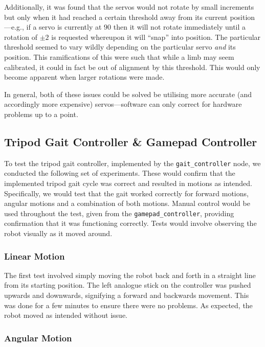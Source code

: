 Additionally, it was found that the servos would not rotate by small increments but only when it had reached a certain threshold away from its current position---e.g., if a servo is currently at $90$\textdegree{} then it will not rotate immediately until a rotation of $\pm2$\textdegree{} is requested whereupon it will ``snap'' into position. The particular threshold seemed to vary wildly depending on the particular servo \emph{and} its position. This ramifications of this were such that while a limb may seem calibrated, it could in fact be out of alignment by this threshold. This would only become apparent when larger rotations were made.

In general, both of these issues could be solved be utilising more accurate (and accordingly more expensive) servos---software can only correct for hardware problems up to a point.

\subsection{Tripod Gait Controller \& Gamepad Controller}

To test the tripod gait controller, implemented by the \texttt{gait\_controller} node, we conducted the following set of experiments. These would confirm that the implemented tripod gait cycle was correct and resulted in motions as intended. Specifically, we would test that the gait worked correctly for forward motions, angular motions and a combination of both motions. Manual control would be used throughout the test, given from the \texttt{gamepad\_controller}, providing confirmation that it was functioning correctly. Tests would involve observing the robot visually as it moved around.

\subsubsection{Linear Motion}

The first test involved simply moving the robot back and forth in a straight line from its starting position. The left analogue stick on the controller was pushed upwards and downwards, signifying a forward and backwards movement. This was done for a few minutes to ensure there were no problems. As expected, the robot moved as intended without issue.

\subsubsection{Angular Motion}

